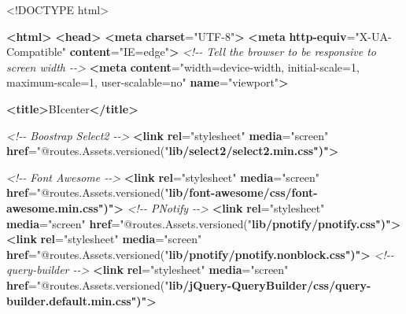 \documentclass[
  11pt,
]{krantz}
\newenvironment{Shaded}{\begin{snugshade}}{\end{snugshade}}
\newcommand{\CommentTok}[1]{\textcolor[rgb]{0.37,0.37,0.37}{\textit{#1}}}
\newcommand{\DataTypeTok}[1]{\textcolor[rgb]{0.27,0.27,0.27}{#1}}
\newcommand{\ErrorTok}[1]{\textcolor[rgb]{0.14,0.14,0.14}{\textbf{#1}}}
\newcommand{\KeywordTok}[1]{\textcolor[rgb]{0.27,0.27,0.27}{\textbf{#1}}}
\newcommand{\NormalTok}[1]{#1}
\newcommand{\OtherTok}[1]{\textcolor[rgb]{0.37,0.37,0.37}{#1}}
\newcommand{\StringTok}[1]{\textcolor[rgb]{0.5,0.5,0.5}{#1}}
\begin{document}
\begin{Shaded}
\begin{Highlighting}[]
\DataTypeTok{\textless{}!DOCTYPE }\NormalTok{html}\DataTypeTok{\textgreater{}}

\KeywordTok{\textless{}html\textgreater{}}
    \KeywordTok{\textless{}head\textgreater{}}
        \KeywordTok{\textless{}meta} \ErrorTok{charset}\OtherTok{=}\StringTok{"UTF{-}8"}\KeywordTok{\textgreater{}}
    \KeywordTok{\textless{}meta} \ErrorTok{http{-}equiv}\OtherTok{=}\StringTok{"X{-}UA{-}Compatible"} \ErrorTok{content}\OtherTok{=}\StringTok{"IE=edge"}\KeywordTok{\textgreater{}}
    \CommentTok{\textless{}!{-}{-} Tell the browser to be responsive to screen width {-}{-}\textgreater{}}
    \KeywordTok{\textless{}meta} \ErrorTok{content}\OtherTok{=}\StringTok{"width=device{-}width, initial{-}scale=1, maximum{-}scale=1, user{-}scalable=no"} \ErrorTok{name}\OtherTok{=}\StringTok{"viewport"}\KeywordTok{\textgreater{}}

    \KeywordTok{\textless{}title\textgreater{}}\NormalTok{BIcenter}\KeywordTok{\textless{}/title\textgreater{}}

    \CommentTok{\textless{}!{-}{-} Boostrap Select2 {-}{-}\textgreater{}}
    \KeywordTok{\textless{}link} \ErrorTok{rel}\OtherTok{=}\StringTok{"stylesheet"} \ErrorTok{media}\OtherTok{=}\StringTok{"screen"} \ErrorTok{href}\OtherTok{=}\StringTok{"@routes.Assets.versioned("}\ErrorTok{lib/select2/select2.min.css")"}\KeywordTok{\textgreater{}}

    \CommentTok{\textless{}!{-}{-} Font Awesome {-}{-}\textgreater{}}
    \KeywordTok{\textless{}link} \ErrorTok{rel}\OtherTok{=}\StringTok{"stylesheet"} \ErrorTok{media}\OtherTok{=}\StringTok{"screen"} \ErrorTok{href}\OtherTok{=}\StringTok{"@routes.Assets.versioned("}\ErrorTok{lib/font{-}awesome/css/font{-}awesome.min.css")"}\KeywordTok{\textgreater{}}
    \CommentTok{\textless{}!{-}{-} PNotify {-}{-}\textgreater{}}
    \KeywordTok{\textless{}link} \ErrorTok{rel}\OtherTok{=}\StringTok{"stylesheet"} \ErrorTok{media}\OtherTok{=}\StringTok{"screen"} \ErrorTok{href}\OtherTok{=}\StringTok{"@routes.Assets.versioned("}\ErrorTok{lib/pnotify/pnotify.css")"}\KeywordTok{\textgreater{}}
    \KeywordTok{\textless{}link} \ErrorTok{rel}\OtherTok{=}\StringTok{"stylesheet"} \ErrorTok{media}\OtherTok{=}\StringTok{"screen"} \ErrorTok{href}\OtherTok{=}\StringTok{"@routes.Assets.versioned("}\ErrorTok{lib/pnotify/pnotify.nonblock.css")"}\KeywordTok{\textgreater{}}
    \CommentTok{\textless{}!{-}{-} query{-}builder {-}{-}\textgreater{}}
    \KeywordTok{\textless{}link} \ErrorTok{rel}\OtherTok{=}\StringTok{"stylesheet"} \ErrorTok{media}\OtherTok{=}\StringTok{"screen"} \ErrorTok{href}\OtherTok{=}\StringTok{"@routes.Assets.versioned("}\ErrorTok{lib/jQuery{-}QueryBuilder/css/query{-}builder.default.min.css")"}\KeywordTok{\textgreater{}}


\end{Highlighting}
\end{Shaded}
\end{document}
